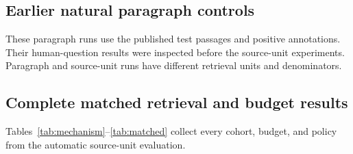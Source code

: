 \subsection{Earlier natural paragraph controls}

These paragraph runs use the published test passages and positive annotations.
Their human-question results were inspected before the source-unit experiments.
Paragraph and source-unit runs have different retrieval units and denominators.

\subsection{Complete matched retrieval and budget results}
Tables~\ref{tab:mechanism}--\ref{tab:matched} collect every cohort, budget, and policy from the automatic source-unit evaluation.



